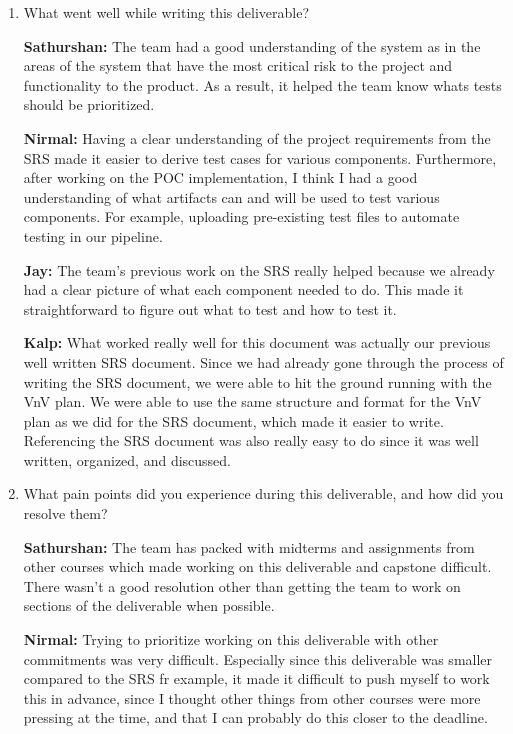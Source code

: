 \documentclass[12pt, titlepage]{article}
\begin{document}
\begin{enumerate}
  \item What went well while writing this deliverable?

  \textbf{Sathurshan:} The team had a good understanding of the system as in
  the areas of the system that have the most critical risk to the project and
  functionality to the product. As a result, it helped the team know whats tests
  should be prioritized.

  \textbf{Nirmal:} Having a clear understanding of the project requirements 
  from the SRS made it easier to derive test cases for various components. 
  Furthermore, after working on the POC implementation, I think I had a good 
  understanding of what artifacts can and will be used to test various 
  components. For example, uploading pre-existing test files to automate 
  testing in our pipeline.

  \textbf{Jay:} The team's previous work on the SRS really helped because we already 
  had a clear picture of what each component needed to do. 
  This made it straightforward to figure out what to test and how to test it.

  \textbf{Kalp:} What worked really well for this document was actually our 
  previous well written SRS document. Since we had already gone through the 
  process of writing the SRS document, we were able to hit the ground running 
  with the VnV plan. We were able to use the same structure and format for the 
  VnV plan as we did for the SRS document, which made it easier to write.
  Referencing the SRS document was also really easy to do since it was well 
  written, organized, and discussed. 

  \item What pain points did you experience during this deliverable, and how
    did you resolve them?

  \textbf{Sathurshan:} The team has packed with midterms and assignments from
  other courses which made working on this deliverable and capstone difficult.
  There wasn't a good resolution other than getting the team to work on sections
  of the deliverable when possible.

  \textbf{Nirmal:} Trying to prioritize working on this deliverable with other 
  commitments was very difficult. Especially since this deliverable was smaller 
  compared to the SRS fr example, it made it difficult to push myself to work 
  this in advance, since I thought other things from other courses were more 
  pressing at the time, and that I can probably do this closer to the deadline.


\end{enumerate}
\end{document}
